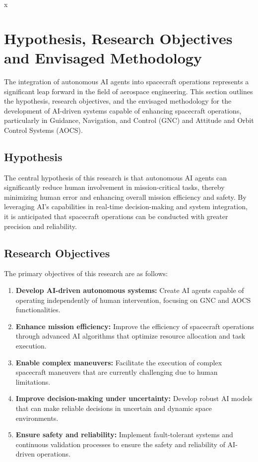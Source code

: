 \documentclass[a4paper,12pt]{article}
\begin{document}
x
\section{Hypothesis, Research Objectives and Envisaged Methodology}

The integration of autonomous AI agents into spacecraft operations represents a significant leap forward in the field of aerospace engineering. This section outlines the hypothesis, research objectives, and the envisaged methodology for the development of AI-driven systems capable of enhancing spacecraft operations, particularly in Guidance, Navigation, and Control (GNC) and Attitude and Orbit Control Systems (AOCS).

\subsection{Hypothesis}

The central hypothesis of this research is that autonomous AI agents can significantly reduce human involvement in mission-critical tasks, thereby minimizing human error and enhancing overall mission efficiency and safety. By leveraging AI's capabilities in real-time decision-making and system integration, it is anticipated that spacecraft operations can be conducted with greater precision and reliability.

\subsection{Research Objectives}

The primary objectives of this research are as follows:

\begin{enumerate}
    \item \textbf{Develop AI-driven autonomous systems:} Create AI agents capable of operating independently of human intervention, focusing on GNC and AOCS functionalities.
    \item \textbf{Enhance mission efficiency:} Improve the efficiency of spacecraft operations through advanced AI algorithms that optimize resource allocation and task execution.
    \item \textbf{Enable complex maneuvers:} Facilitate the execution of complex spacecraft maneuvers that are currently challenging due to human limitations.
    \item \textbf{Improve decision-making under uncertainty:} Develop robust AI models that can make reliable decisions in uncertain and dynamic space environments.
    \item \textbf{Ensure safety and reliability:} Implement fault-tolerant systems and continuous validation processes to ensure the safety and reliability of AI-driven operations.
\end{enumerate}
\end{document}
